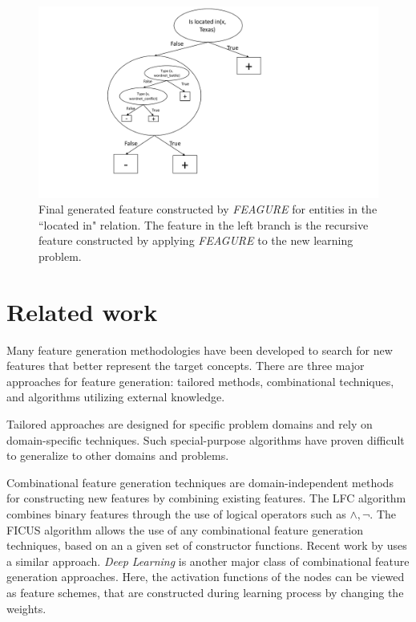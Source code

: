 \documentclass[letterpaper]{article} %
\theoremstyle{definition}
\begin{document}
\begin{figure}[!h]
	\centering
	\includegraphics[width=0.9\linewidth]{figure_rec3_feature_new}
	\caption{Final generated feature constructed by \emph{FEAGURE} for entities in the ``located in" relation. The feature in the left branch is the recursive feature constructed by applying \emph{FEAGURE} to the new learning problem.}
	\label{fig:figure_rec3_feature_full}
\end{figure}

\section{Related work}

Many feature generation methodologies have been developed to search for new features that better represent the target concepts. There are three major approaches for feature generation: tailored methods, combinational techniques, and algorithms utilizing external knowledge.

Tailored approaches \cite{sutton1991learning,hirsh1994bootstrapping} are designed for specific problem domains and rely on domain-specific techniques. %
Such special-purpose algorithms %
have proven difficult to generalize to other domains and problems.

Combinational feature generation techniques are domain-independent methods for constructing new features by combining existing features. The LFC algorithm \cite{ragavan1993complex} combines binary features through the use of logical operators such as $\land ,\lnot$.
The FICUS algorithm \cite{markovitch2002feature} allows the use of any combinational feature generation techniques, based on an a given set of constructor functions. Recent work by \citeauthor{katz2016explorekit}  uses a similar approach.
\emph{Deep Learning} \cite{rumelhart1986learning,lecun1998gradient} is another major class of combinational feature generation approaches. Here, the activation functions of the nodes can be viewed as feature schemes, that are constructed during learning process by changing the weights.
\end{document}
